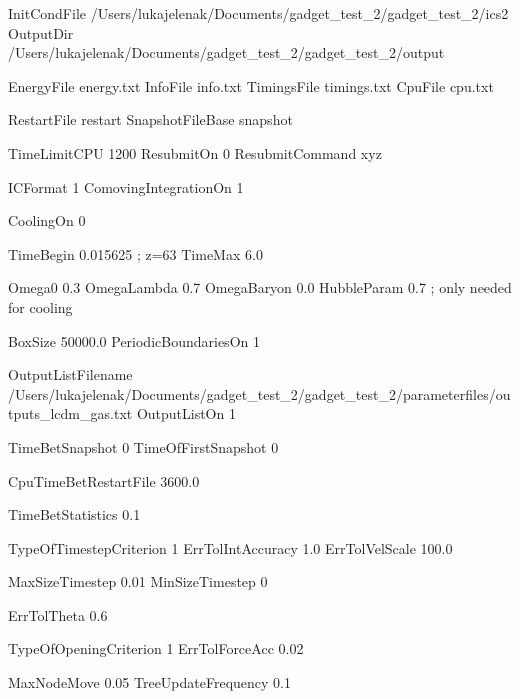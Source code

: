 
InitCondFile  		/Users/lukajelenak/Documents/gadget_test_2/gadget_test_2/ics2
OutputDir         /Users/lukajelenak/Documents/gadget_test_2/gadget_test_2/output

EnergyFile        energy.txt
InfoFile          info.txt
TimingsFile       timings.txt
CpuFile           cpu.txt

RestartFile       restart
SnapshotFileBase  snapshot



TimeLimitCPU      1200 %
ResubmitOn        0
ResubmitCommand   xyz



ICFormat              1
ComovingIntegrationOn 1

CoolingOn 0


TimeBegin           0.015625  ; z=63
TimeMax	            6.0

Omega0	              0.3  %
OmegaLambda           0.7  %
OmegaBaryon           0.0
HubbleParam           0.7   ; only needed for cooling

BoxSize                50000.0
PeriodicBoundariesOn   1



OutputListFilename   /Users/lukajelenak/Documents/gadget_test_2/gadget_test_2/parameterfiles/outputs_lcdm_gas.txt
OutputListOn        1

TimeBetSnapshot        0
TimeOfFirstSnapshot    0
 
CpuTimeBetRestartFile  3600.0

TimeBetStatistics      0.1



TypeOfTimestepCriterion 1
ErrTolIntAccuracy       1.0
ErrTolVelScale          100.0

MaxSizeTimestep        0.01 
MinSizeTimestep        0



ErrTolTheta            0.6            

TypeOfOpeningCriterion 1
ErrTolForceAcc         0.02


MaxNodeMove            0.05
TreeUpdateFrequency    0.1



